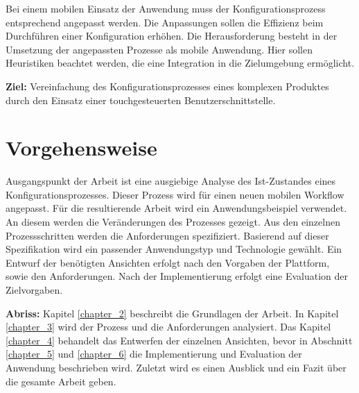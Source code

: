 Bei einem mobilen Einsatz der Anwendung muss der Konfigurationsprozess entsprechend angepasst werden. Die Anpassungen sollen die Effizienz beim Durchführen einer Konfiguration erhöhen. Die Herausforderung besteht in der Umsetzung der angepassten Prozesse als mobile Anwendung. Hier sollen Heuristiken beachtet werden, die eine Integration in die Zielumgebung ermöglicht. 



\begin{mdframed}[backgroundcolor=gray!40,shadow=true,roundcorner=8pt]
\textbf{Ziel:} \newline
Vereinfachung des Konfigurationsprozesses eines komplexen Produktes durch den Einsatz einer touchgesteuerten Benutzerschnittstelle.
\end{mdframed}

\section{Vorgehensweise}
Ausgangspunkt der Arbeit ist eine ausgiebige Analyse des Ist-Zustandes eines Konfigurationsprozesses. Dieser Prozess wird für einen neuen mobilen Workflow angepasst. Für die resultierende Arbeit wird ein Anwendungsbeispiel verwendet. An diesem werden die Veränderungen des Prozesses gezeigt. Aus den einzelnen Prozessschritten werden die Anforderungen spezifiziert. Basierend auf dieser Spezifikation wird ein passender Anwendungstyp und Technologie gewählt. Ein Entwurf der benötigten Ansichten erfolgt nach den Vorgaben der Plattform, sowie den Anforderungen. Nach der Implementierung erfolgt eine Evaluation der Zielvorgaben. 
\par
\textbf{Abriss: }
Kapitel \ref{chapter_2} beschreibt die Grundlagen der Arbeit. In Kapitel \ref{chapter_3} wird der Prozess und die Anforderungen analysiert. Das Kapitel \ref{chapter_4} behandelt das Entwerfen der einzelnen Ansichten, bevor in Abschnitt \ref{chapter_5} und \ref{chapter_6} die Implementierung und Evaluation der Anwendung beschrieben wird. Zuletzt wird es einen Ausblick und ein Fazit über die gesamte Arbeit geben.








